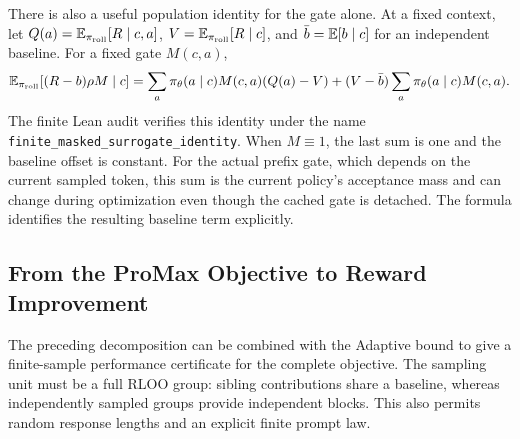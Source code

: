 There is also a useful population identity for the gate alone. At a fixed context, let
$Q(a)=\mathbb{E}_{\pi_{\mathrm{roll}}}[R\mid c,a]$, $V=\mathbb{E}_{\pi_{\mathrm{roll}}}[R\mid c]$, and $\bar b=\mathbb{E}[b\mid c]$ for an independent baseline.
For a fixed gate $M(c,a)$,
\begin{equation*}
    \mathbb{E}_{\pi_{\mathrm{roll}}}[(R-b)\rho M\mid c]
    =\sum_a\pi_{\theta}(a\mid c)M(c,a)(Q(a)-V)
      +(V-\bar b)\sum_a\pi_{\theta}(a\mid c)M(c,a).
\end{equation*}
The finite Lean audit verifies this identity under the name
\texttt{finite\_masked\_surrogate\_identity}.
When $M\equiv1$, the last sum is one and the baseline offset is constant.
For the actual prefix gate, which depends on the current sampled token, this sum is the current policy's acceptance mass and
can change during optimization even though the cached gate is detached. The formula identifies the resulting baseline term explicitly.

\subsection{From the ProMax Objective to Reward Improvement}
\label{sec:promax-certificate}

The preceding decomposition can be combined with the Adaptive bound to give
a finite-sample performance certificate for the complete objective. The
sampling unit must be a full RLOO group: sibling contributions share a
baseline, whereas independently sampled groups provide independent blocks.
This also permits random response lengths and an explicit finite prompt law.

